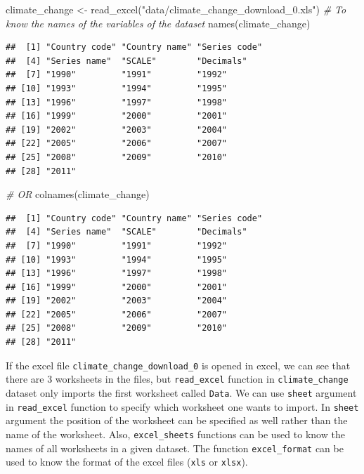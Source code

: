 \documentclass[
]{book}
\newenvironment{Shaded}{\begin{snugshade}}{\end{snugshade}}
\newcommand{\CommentTok}[1]{\textcolor[rgb]{0.56,0.35,0.01}{\textit{#1}}}
\newcommand{\FunctionTok}[1]{\textcolor[rgb]{0.00,0.00,0.00}{#1}}
\newcommand{\NormalTok}[1]{#1}
\newcommand{\OtherTok}[1]{\textcolor[rgb]{0.56,0.35,0.01}{#1}}
\newcommand{\StringTok}[1]{\textcolor[rgb]{0.31,0.60,0.02}{#1}}
\begin{document}
\begin{Shaded}
\begin{Highlighting}[]
\NormalTok{climate\_change }\OtherTok{\textless{}{-}} \FunctionTok{read\_excel}\NormalTok{(}\StringTok{"data/climate\_change\_download\_0.xls"}\NormalTok{)}
\CommentTok{\# To know the names of the variables of the dataset }
\FunctionTok{names}\NormalTok{(climate\_change)}
\end{Highlighting}
\end{Shaded}

\begin{verbatim}
##  [1] "Country code" "Country name" "Series code" 
##  [4] "Series name"  "SCALE"        "Decimals"    
##  [7] "1990"         "1991"         "1992"        
## [10] "1993"         "1994"         "1995"        
## [13] "1996"         "1997"         "1998"        
## [16] "1999"         "2000"         "2001"        
## [19] "2002"         "2003"         "2004"        
## [22] "2005"         "2006"         "2007"        
## [25] "2008"         "2009"         "2010"        
## [28] "2011"
\end{verbatim}

\begin{Shaded}
\begin{Highlighting}[]
\CommentTok{\# OR}
\FunctionTok{colnames}\NormalTok{(climate\_change)}
\end{Highlighting}
\end{Shaded}

\begin{verbatim}
##  [1] "Country code" "Country name" "Series code" 
##  [4] "Series name"  "SCALE"        "Decimals"    
##  [7] "1990"         "1991"         "1992"        
## [10] "1993"         "1994"         "1995"        
## [13] "1996"         "1997"         "1998"        
## [16] "1999"         "2000"         "2001"        
## [19] "2002"         "2003"         "2004"        
## [22] "2005"         "2006"         "2007"        
## [25] "2008"         "2009"         "2010"        
## [28] "2011"
\end{verbatim}

If the excel file \texttt{climate\_change\_download\_0} is opened in excel, we can see that there are 3 worksheets in the files, but \texttt{read\_excel} function in \texttt{climate\_change} dataset only imports the first worksheet called \texttt{Data}. We can use \texttt{sheet} argument in \texttt{read\_excel} function to specify which worksheet one wants to import. In \texttt{sheet} argument the position of the worksheet can be specified as well rather than the name of the worksheet. Also, \texttt{excel\_sheets} functions can be used to know the names of all worksheets in a given dataset. The function \texttt{excel\_format} can be used to know the format of the excel files (\texttt{xls} or \texttt{xlsx}).
\end{document}
